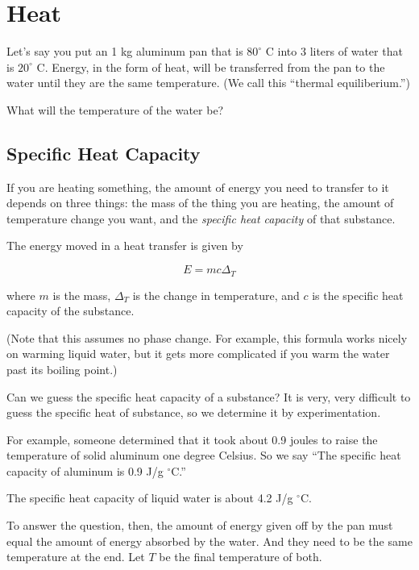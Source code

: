 \chapter{Heat}

Let's say you put an 1 kg aluminum pan that is $80^\circ$ C into
3 liters of water that is $20^\circ$ C. Energy, in the form of heat,
will be transferred from the pan to the water until they are the same
temperature. (We call this ``thermal equiliberium.'')

What will the temperature of the water be?

\section{Specific Heat Capacity}

If you are heating something, the amount of energy you need to
transfer to it depends on three things: the mass of the thing you are
heating, the amount of temperature change you want, and the
\textit{specific heat capacity} of that substance.

\begin{mdframed}[style=important, frametitle={Energy in Heat Transfer}]

  The energy moved in a heat transfer is given by

  $$E = m c \Delta_T$$

  where $m$ is the mass, $\Delta_T$ is the change in temperature, and
  $c$ is the specific heat capacity of the substance.

  (Note that this
  assumes no phase change. For example, this formula works nicely on
  warming liquid water, but it gets more complicated if you warm the
  water past its boiling point.)

\end{mdframed}

Can we guess the specific heat capacity of a substance? It is very,
very difficult to guess the specific heat of substance, so we determine
it by experimentation.

For example, someone determined that it took about 0.9 joules to raise
the temperature of solid aluminum one degree Celsius. So we say ``The
specific heat capacity of aluminum is 0.9 J/g $^\circ$C.''

The specific heat capacity of liquid water is about 4.2 J/g $^\circ$C.

To answer the question, then, the amount of energy given off by the
pan must equal the amount of energy absorbed by the water. And they
need to be the same temperature at the end.  Let $T$ be the final
temperature of both.


